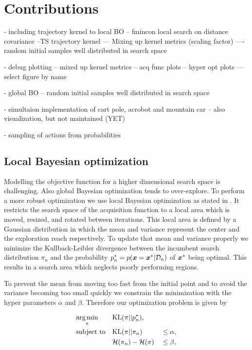 \chapter{Contributions}
\label{chap:contributions}

- including trajectory kernel to local BO
-- fmincon local search on distance covariance
--TS trajectory kernel
--- Mixing up kernel metrics (scaling factor)
---- random initial samples well distributed in search space

- debug plotting
-- mixed up kernel metrics
-- acq func plots
-- hyper opt plots
--- select figure by name

- global BO
-- random initial samples well distributed in search space

- simultaion implementation of cart pole, acrobot and mountain car
-- also visualization, but not maintained (YET)

- sampling of actions from probabilities

\section{Local Bayesian optimization}

Modelling the objective function for a higher dimensional search space is challenging. Also global Bayesian optimization tends to over-explore. To perform a more robust optimization we use local Bayesian optimization as stated in \cite{akrour2017local}. It restricts the search space of the acquisition function to a local area which is moved, resized, and rotated between iterations. This local area is defined by a Gaussian distribution in which the mean and variance represent the center and the exploration reach respectively. To update that mean and variance properly we minimize the Kullback-Leibler divergence between the incumbent search distribution $\pi_n$ and the probability $p_n^* = p({\boldsymbol{x}}={\boldsymbol{x}}^*|\mathcal{D}_n)$ of ${\boldsymbol{x}}^*$ being optimal. This results in a search area which neglects poorly performing regions.

To prevent the mean from moving too fast from the initial point and to avoid the variance becoming too small quickly we constrain the minimization with the hyper parameters $\alpha$ and $\beta$. Therefore our optimization problem is given by

\begin{align}
    & \underset{\pi}{\arg\min} & & \mathrm{KL}(\pi||p_n^\star),& &\notag\\
    & \text{subject to}
    & & \mathrm{KL}(\pi||\pi_n) & &\leq \alpha,\label{eq:kl:our}\\
    & & &{\cal H}(\pi_n) - {\cal H}(\pi) & &\leq \beta,\label{eq:entropy:our}
\end{align}

